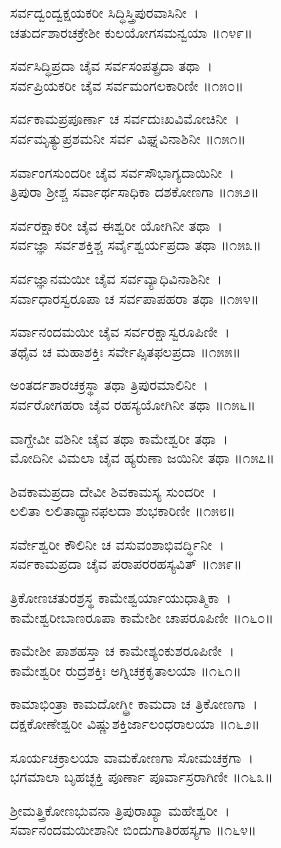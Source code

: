 ಸರ್ವದ್ವಂದ್ವಕ್ಷಯಕರೀ ಸಿದ್ಧಿಸ್ತ್ರಿಪುರವಾಸಿನೀ~।\\
ಚತುರ್ದಶಾರಚಕ್ರೇಶೀ ಕುಲಯೋಗಸಮನ್ವಯಾ ॥೧೪೯॥

	ಸರ್ವಸಿದ್ಧಿಪ್ರದಾ ಚೈವ ಸರ್ವಸಂಪತ್ಪ್ರದಾ ತಥಾ~।\\
	ಸರ್ವಪ್ರಿಯಕರೀ ಚೈವ ಸರ್ವಮಂಗಲಕಾರಿಣೀ ॥೧೫೦॥

ಸರ್ವಕಾಮಪ್ರಪೂರ್ಣಾ ಚ ಸರ್ವದುಃಖವಿಮೋಚಿನೀ~।\\
ಸರ್ವಮೃತ್ಯುಪ್ರಶಮನೀ ಸರ್ವ ವಿಘ್ನವಿನಾಶಿನೀ ॥೧೫೧॥

	ಸರ್ವಾಂಗಸುಂದರೀ ಚೈವ ಸರ್ವಸೌಭಾಗ್ಯದಾಯಿನೀ~।\\
	ತ್ರಿಪುರಾ ಶ್ರೀಶ್ಚ ಸರ್ವಾರ್ಥಸಾಧಿಕಾ ದಶಕೋಣಗಾ ॥೧೫೨॥

ಸರ್ವರಕ್ಷಾಕರೀ ಚೈವ ಈಶ್ವರೀ ಯೋಗಿನೀ ತಥಾ~।\\
ಸರ್ವಜ್ಞಾ ಸರ್ವಶಕ್ತಿಶ್ಚ ಸರ್ವೈಶ್ವರ್ಯಪ್ರದಾ ತಥಾ ॥೧೫೩॥

	ಸರ್ವಜ್ಞಾನಮಯೀ ಚೈವ ಸರ್ವವ್ಯಾಧಿವಿನಾಶಿನೀ~।\\
	ಸರ್ವಾಧಾರಸ್ವರೂಪಾ ಚ ಸರ್ವಪಾಪಹರಾ ತಥಾ ॥೧೫೪॥

ಸರ್ವಾನಂದಮಯೀ ಚೈವ ಸರ್ವರಕ್ಷಾಸ್ವರೂಪಿಣೀ~।\\
ತಥೈವ ಚ ಮಹಾಶಕ್ತಿಃ ಸರ್ವೇಪ್ಸಿತಫಲಪ್ರದಾ ॥೧೫೫॥

	ಅಂತರ್ದಶಾರಚಕ್ರಸ್ಥಾ ತಥಾ ತ್ರಿಪುರಮಾಲಿನೀ~।\\
	ಸರ್ವರೋಗಹರಾ ಚೈವ ರಹಸ್ಯಯೋಗಿನೀ ತಥಾ ॥೧೫೬॥

ವಾಗ್ದೇವೀ ವಶಿನೀ ಚೈವ ತಥಾ ಕಾಮೇಶ್ವರೀ ತಥಾ~।\\
ಮೋದಿನೀ ವಿಮಲಾ ಚೈವ ಹ್ಯರುಣಾ ಜಯಿನೀ ತಥಾ ॥೧೫೭॥

	ಶಿವಕಾಮಪ್ರದಾ ದೇವೀ ಶಿವಕಾಮಸ್ಯ ಸುಂದರೀ~।\\
	ಲಲಿತಾ ಲಲಿತಾಧ್ಯಾನಫಲದಾ ಶುಭಕಾರಿಣೀ ॥೧೫೮॥

ಸರ್ವೇಶ್ವರೀ ಕೌಲಿನೀ ಚ ವಸುವಂಶಾಭಿವರ್ದ್ಧಿನೀ~।\\
ಸರ್ವಕಾಮಪ್ರದಾ ಚೈವ ಪರಾಪರರಹಸ್ಯವಿತ್ ॥೧೫೯॥

	ತ್ರಿಕೋಣಚತುರಶ್ರಸ್ಥ ಕಾಮೇಶ್ವರ್ಯಾಯುಧಾತ್ಮಿಕಾ~।\\
	ಕಾಮೇಶ್ವರೀಬಾಣರೂಪಾ ಕಾಮೇಶೀ ಚಾಪರೂಪಿಣೀ ॥೧೬೦॥

ಕಾಮೇಶೀ ಪಾಶಹಸ್ತಾ ಚ ಕಾಮೇಶ್ಯಂಕುಶರೂಪಿಣೀ~।\\
ಕಾಮೇಶ್ವರೀ ರುದ್ರಶಕ್ತಿಃ ಅಗ್ನಿಚಕ್ರಕೃತಾಲಯಾ ॥೧೬೧॥

	ಕಾಮಾಭಿಂತ್ರಾ ಕಾಮದೋಗ್ಧ್ರೀ ಕಾಮದಾ ಚ ತ್ರಿಕೋಣಗಾ~।\\
	ದಕ್ಷಕೋಣೇಶ್ವರೀ ವಿಷ್ಣುಶಕ್ತಿರ್ಜಾಲಂಧರಾಲಯಾ ॥೧೬೨॥

ಸೂರ್ಯಚಕ್ರಾಲಯಾ ವಾಮಕೋಣಗಾ ಸೋಮಚಕ್ರಗಾ~।\\
ಭಗಮಾಲಾ ಬೃಹಚ್ಛಕ್ತಿ ಪೂರ್ಣಾ ಪೂರ್ವಾಸ್ರರಾಗಿಣೀ ॥೧೬೩॥

	ಶ್ರೀಮತ್ತ್ರಿಕೋಣಭುವನಾ ತ್ರಿಪುರಾಖ್ಯಾ ಮಹೇಶ್ವರೀ~।\\
	ಸರ್ವಾನಂದಮಯೀಶಾನೀ ಬಿಂದುಗಾತಿರಹಸ್ಯಗಾ ॥೧೬೪॥

